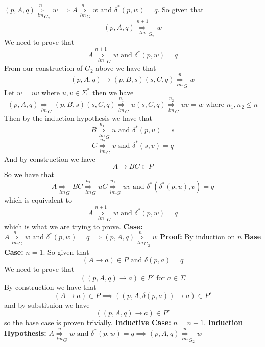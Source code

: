 \documentclass[12pt]{article}
\begin{document}
$(p,A,q) \underset{lm}{\overset{n}{\Longrightarrow}}_{G_2} w
\implies A \underset{lm}{\overset{n}{\Longrightarrow}}_{G} w
\text{ and } \delta^*(p,w) = q$.
\medskip \newline
So given that
$$(p,A,q) \underset{lm}{\overset{n+1}{\Longrightarrow}}_{G_2} w$$
We need to prove that
$$A \underset{lm}{\overset{n+1}{\Longrightarrow}}_{G} w
\text{ and } \delta^*(p,w) = q$$
From our construction of $G_2$ above we have that
$$(p,A,q) \rightarrow (p,B,s)(s,C,q)
\underset{lm}{\overset{n}{\Longrightarrow}}_{G} w$$
Let $w=uv$ where $u,v\in \Sigma^*$ then we have
$$ (p,A,q) \underset{lm}{\Longrightarrow}_{G} (p,B,s)(s,C,q)
\underset{lm}{\overset{n_1}{\Longrightarrow}}_{G} u(s,C,q)
\underset{lm}{\overset{n_2}{\Longrightarrow}}_{G} uv = w
\text{ where } n_1,n_2 \le n $$
Then by the induction hypothesis we have that
$$B \underset{lm}{\overset{n_1}{\Longrightarrow}}_{G} u
\text{ and } \delta^*(p,u) = s$$
$$C \underset{lm}{\overset{n_2}{\Longrightarrow}}_{G} v
\text{ and } \delta^*(s,v) = q$$
And by construction we have
$$A\rightarrow BC \in P$$
So we have that
$$A \underset{lm}{\Longrightarrow}_{G} BC
\underset{lm}{\overset{n_1}{\Longrightarrow}}_{G} uC
\underset{lm}{\overset{n_1}{\Longrightarrow}}_{G} uv
\text{ and } \delta^*(\delta^*(p,u),v) = q$$
which is equivalent to
$$A \underset{lm}{\overset{n+1}{\Longrightarrow}}_{G} w
\text{ and } \delta^*(p,w) = q$$
which is what we are trying to prove.
\medskip \newline
\textbf{Case: } $A \underset{lm}{\overset{n}{\Longrightarrow}}_{G} w
\text{ and } \delta^*(p,w) = q \implies
(p,A,q) \underset{lm}{\overset{n}{\Longrightarrow}}_{G_2} w$
\newline \textbf{Proof: } By induction on $n$
\newline \textbf{Base Case: } $n = 1$.
\medskip \newline
So given that
$$ (A \rightarrow a) \in P \text{ and } \delta(p,a) = q$$
We need to prove that
$$((p,A,q) \rightarrow a) \in P' \text{ for } a\in \Sigma$$
By construction we have that
$$(A \rightarrow a) \in P \implies ((p,A,\delta(p,a)) \rightarrow a) \in P'$$
and by substituion we have
$$((p,A,q) \rightarrow a) \in P'$$
so the base case is proven trivially.
\medskip \newline
\textbf{Inductive Case: } $n = n+1$.
\newline \textbf{Induction Hypothesis: }
$A \underset{lm}{\overset{n}{\Longrightarrow}}_{G} w
\text{ and } \delta^*(p,w) = q \implies
(p,A,q) \underset{lm}{\overset{n}{\Longrightarrow}}_{G_2} w$
\medskip \newline
\end{document}
